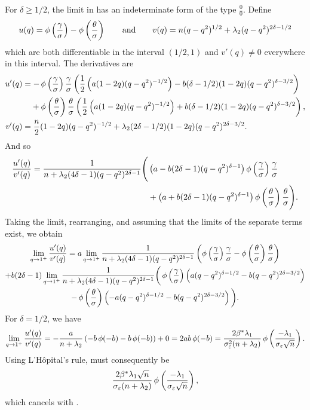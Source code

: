 For \(\delta \geq 1/2\), the limit in  has an indeterminate
form of the type \(\frac{0}{0}\). Define
\[
  u(q) = \operatorname{\phi}\left(\frac{\gamma}{\sigma}\right) - \operatorname{\phi}\left(\frac{\theta}{\sigma}\right)
  \qquad\text{and}\qquad
  v(q) = n(q - q^2)^{1/2} + \lambda_2 (q - q^2)^{2\delta - 1/2}
\]
which are both differentiable in the interval \((1/2, 1)\) and \(v'(q) \neq 0\) everywhere
in this interval. The derivatives are
\[
  \begin{aligned}
    u'(q) & = -\pdf\left(\frac{\gamma}{\sigma}\right)\frac{\gamma}{\sigma} \left(\frac{1}{2}\left(a(1-2q)(q - q^2)^{-1/2}\right) - b(\delta - 1/2)(1- 2q)(q - q^2)^{\delta - 3/2}\right)                 \\
          & \phantom{= {}} + \pdf\left(\frac{\theta}{\sigma}\right) \frac{\theta}{\sigma} \left(\frac{1}{2}\left(a(1-2q)(q - q^2)^{-1/2}\right) + b(\delta - 1/2)(1- 2q)(q - q^2)^{\delta - 3/2}\right), \\
    v'(q) & = \frac{n}{2} (1 - 2q)(q - q^2)^{-1/2} + \lambda_2(2\delta - 1/2)(1 - 2q)(q - q^2)^{2\delta - 3/2}.
  \end{aligned}
\]
And so
\begin{equation}
  \begin{split}
    \frac{u'(q)}{v'(q)} = \frac{1}{n + \lambda_2(4\delta - 1)(q - q^2)^{2\delta - 1}}  \Bigg( & \left(a - b(2\delta - 1)(q - q^2)^{\delta - 1}\right) \operatorname{\phi}\left(\frac{\gamma}{\sigma}\right) \frac{\gamma}{\sigma} \\ & + \left(a + b(2\delta - 1)(q - q^2)^{\delta - 1}\right)\operatorname{\phi}\left(\frac{\theta}{\sigma}\right) \frac{\theta}{\sigma}\Bigg).
  \end{split}
\end{equation}
Taking the limit, rearranging, and assuming that the limits of the separate terms exist, we obtain
\begin{multline}
  \label{eq:eval-qlimit-pdfterm-split}
  \lim_{q \rightarrow 1^+} \frac{u'(q)}{v'(q)} = a \lim_{q \rightarrow 1^+}  \frac{1}{n + \lambda_2 (4 \delta - 1)(q - q^2)^{2\delta - 1}} \left( \operatorname{\phi}\left(\frac{\gamma}{\sigma}\right)\frac{\gamma}{\sigma} - \operatorname{\phi}\left(\frac{\theta}{\sigma}\right)\frac{\theta}{\sigma}\right) \\
  + b (2\delta - 1) \lim_{q \rightarrow 1^+} \frac{1}{n + \lambda_2 (4 \delta - 1)(q - q^2)^{2\delta - 1}} \bigg( \operatorname{\phi}\left(\frac{\gamma}{\sigma}\right) \left(a(q -q^2)^{\delta - 1/2}- b(q - q^2)^{2\delta - 3/2} \right) \\
  - \operatorname{\phi}\left(\frac{\theta}{\sigma}\right) \left(-a(q - q^2)^{\delta - 1/2} - b(q - q^2)^{2\delta - 3/2}\right) \bigg).
\end{multline}
For \(\delta = 1/2\), we have
\[
  \lim_{q \rightarrow 1^+} \frac{u'(q)}{v'(q)} = -\frac{a}{n + \lambda_2}\left(-b \operatorname{\phi}(-b) - b \operatorname{\phi}(-b)\right) + 0 = 2ab \operatorname{\phi}(-b) = \frac{2 \beta^* \lambda_1}{\sigma_\varepsilon^2(n + \lambda_2)} \operatorname{\phi} \left(\frac{-\lambda_1}{\sigma_\varepsilon\sqrt{n}}\right).
\]
Using L'Hôpital's rule,  must consequently be
\[
  \frac{2 \beta^* \lambda_1\sqrt{n}}{\sigma_\varepsilon(n + \lambda_2)} \operatorname{\phi} \left(\frac{-\lambda_1}{\sigma_\varepsilon\sqrt{n}}\right),
\]
which cancels with .


